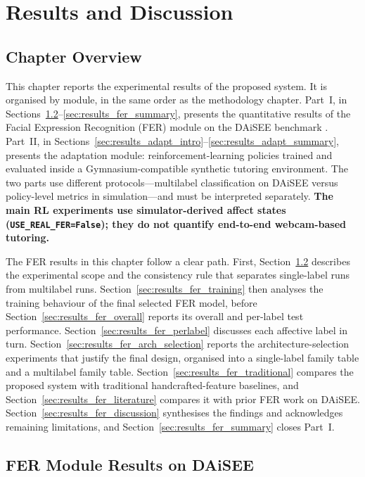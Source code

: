 \chapter{Results and Discussion}\label{chap:results}

\section{Chapter Overview}\label{sec:results_overview}

This chapter reports the experimental results of the proposed system. It is organised by module, in the same order as the methodology chapter. Part~I, in Sections~\ref{sec:results_fer}--\ref{sec:results_fer_summary}, presents the quantitative results of the Facial Expression Recognition (FER) module on the DAiSEE benchmark \cite{gupta_daisee_2016}. Part~II, in Sections~\ref{sec:results_adapt_intro}--\ref{sec:results_adapt_summary}, presents the adaptation module: reinforcement-learning policies trained and evaluated inside a Gymnasium-compatible synthetic tutoring environment. The two parts use different protocols---multilabel classification on DAiSEE versus policy-level metrics in simulation---and must be interpreted separately. \textbf{The main RL experiments use simulator-derived affect states (\texttt{USE\_REAL\_FER=False}); they do not quantify end-to-end webcam-based tutoring.}

The FER results in this chapter follow a clear path. First, Section~\ref{sec:results_fer} describes the experimental scope and the consistency rule that separates single-label runs from multilabel runs. Section~\ref{sec:results_fer_training} then analyses the training behaviour of the final selected FER model, before Section~\ref{sec:results_fer_overall} reports its overall and per-label test performance. Section~\ref{sec:results_fer_perlabel} discusses each affective label in turn. Section~\ref{sec:results_fer_arch_selection} reports the architecture-selection experiments that justify the final design, organised into a single-label family table and a multilabel family table. Section~\ref{sec:results_fer_traditional} compares the proposed system with traditional handcrafted-feature baselines, and Section~\ref{sec:results_fer_literature} compares it with prior FER work on DAiSEE. Section~\ref{sec:results_fer_discussion} synthesises the findings and acknowledges remaining limitations, and Section~\ref{sec:results_fer_summary} closes Part~I.

\section{FER Module Results on DAiSEE}\label{sec:results_fer}


